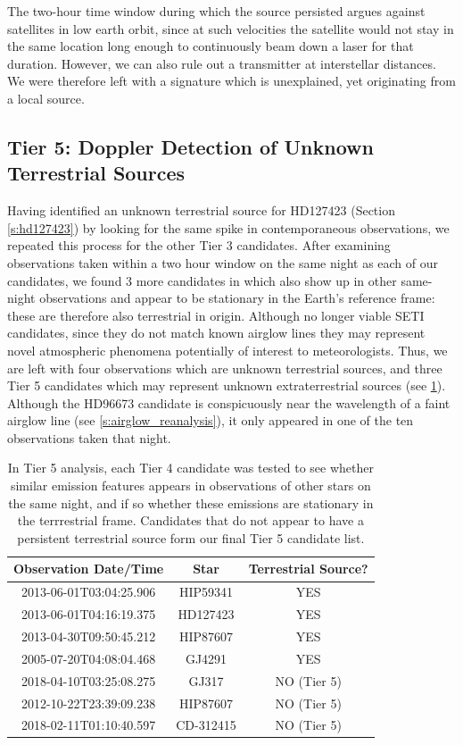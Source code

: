 \documentclass[twocolumn]{aastex701}
\begin{document}
The two-hour time window during which the source persisted argues against satellites in low earth orbit, since at such velocities the satellite would not stay in the same location long enough to continuously beam down a laser for that duration. However, we can also rule out a transmitter at interstellar distances. We were therefore left with a signature which is unexplained, yet originating from a local source. 

\subsection{Tier 5: Doppler Detection of Unknown Terrestrial Sources}
\label{s:doppler}
Having identified an unknown terrestrial source for HD127423 (Section \ref{s:hd127423}) by looking for the same spike in contemporaneous observations,  we repeated this process for the other Tier 3 candidates.  After examining observations taken within a two hour window on the same night as each of our candidates, we found 3 more candidates in which also show up in other same-night observations and appear to be stationary in the Earth's reference frame: these are therefore also terrestrial in origin.  Although no longer viable SETI candidates, since they do not match known airglow lines they may represent novel atmospheric phenomena potentially of interest to meteorologists. Thus, we are left with four observations which are unknown terrestrial sources, and three Tier 5 candidates which may represent unknown extraterrestrial sources (see \ref{tab:terrestrial_or_extraterrestrial}). Although the HD96673 candidate is conspicuously near the wavelength of a faint airglow line (see \ref{s:airglow_reanalysis}), it only appeared in one of the ten observations taken that night.  

\begin{table}
    \centering
    \begin{tabular}{|c|c|c|}
    \hline
        Observation Date/Time  & Star & Terrestrial Source? \\
    \hline
       2013-06-01T03:04:25.906 & HIP59341 & YES \\
       2013-06-01T04:16:19.375 & HD127423 & YES \\
       2013-04-30T09:50:45.212 & HIP87607 & YES \\
       2005-07-20T04:08:04.468 & GJ4291 & YES \\
       2018-04-10T03:25:08.275 & GJ317 & NO (Tier 5)\\
       2012-10-22T23:39:09.238 & HIP87607 & NO (Tier 5)\\
       2018-02-11T01:10:40.597 & CD-312415 & NO (Tier 5)\\
    \hline
    \end{tabular}
    \caption{In Tier 5 analysis, each Tier 4 candidate was tested to see whether similar emission features appears in observations of other stars on the same night, and if so whether these emissions are stationary in the terrrestrial frame.  Candidates that do not appear to have a persistent terrestrial source form our final Tier 5 candidate list.}
    \label{tab:terrestrial_or_extraterrestrial}
\end{table}
\end{document}
